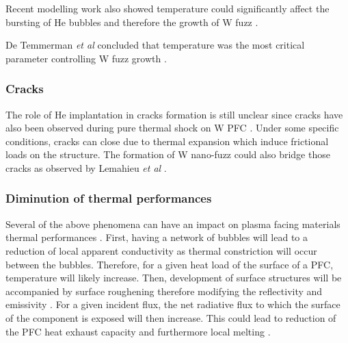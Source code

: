Recent modelling work also showed temperature could significantly affect the bursting of He bubbles and therefore the growth of W fuzz .

De Temmerman \textit{et al} concluded that temperature was the most critical parameter controlling W fuzz growth .

\subsubsection{Cracks}

The role of He implantation in cracks formation is still unclear since cracks have also been observed during pure thermal shock on W PFC .
Under some specific conditions, cracks can close due to thermal expansion which induce frictional loads on the structure.
The formation of W nano-fuzz could also bridge those cracks as observed by Lemahieu \textit{et al} .

\subsubsection{Diminution of thermal performances}

Several of the above phenomena can have an impact on plasma facing materials thermal performances .
First, having a network of bubbles will lead to a reduction of local apparent conductivity as thermal constriction will occur between the bubbles.
Therefore, for a given heat load of the surface of a PFC, temperature will likely increase.
Then, development of surface structures will be accompanied by surface roughening therefore modifying the reflectivity and emissivity .
For a given incident flux, the net radiative flux to which the surface of the component is exposed will then increase.
This could lead to reduction of the PFC heat exhaust capacity and furthermore local melting .



